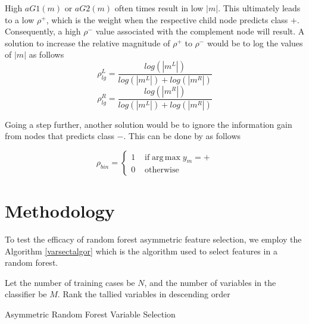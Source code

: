 \documentclass[twoside,11pt]{article}
\begin{document}
High $aG1(m)$ or $aG2(m)$ often times result in low $|m|$. This ultimately leads to a low $\rho^{+}$, which is the weight when the respective child node predicts class $+$. Consequently, a high $\rho^{-}$ value associated with the complement node will result. A solution to increase the relative magnitude of $\rho^{+}$ to $\rho^{-}$ would be to log the values of $|m|$ as follows
\begin{equation}\label{eqn:rho_log}
	\rho_{lg}^L = \frac{log(|m^L|)}{log(|m^L|)+log(|m^R|)}
\end{equation}
\begin{equation}
	\rho_{lg}^R = \frac{log(|m^R|)}{log(|m^L|)+log(|m^R|)}
\end{equation}


Going a step further, another solution would be to ignore the information gain from nodes that predicts class $-$. This can be done by as follows

\begin{equation}
	\rho_{bin} = \begin{cases} 1 & \text{ if} \operatorname{arg\,max} y_m = + 
\\ 0&\text{ otherwise}
\end{cases}
\end{equation}

\section{Methodology}
To test the efficacy of random forest asymmetric feature selection, we employ the Algorithm \ref{varsectalgor} which is the algorithm used to select features in a random forest. 
\begin{algorithm}\label{varsectalgor}
Let the number of training cases be $N$, and the number of variables in the classifier be $M$.
Rank the tallied variables in descending order 

\caption{Asymmetric Random Forest Variable Selection}\label{algo: AsymRandomForest}
\end{algorithm}
\end{document}
